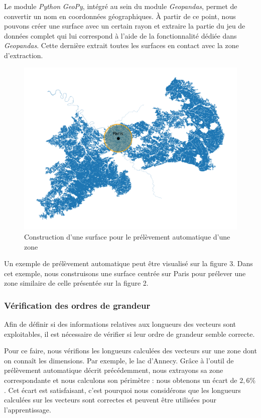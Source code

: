 Le module \emph{Python} \emph{GeoPy}, intégré au sein du module \emph{Geopandas}, permet de convertir un nom en coordonnées géographiques.
À partir de ce point, nous pouvons créer une surface avec un certain rayon et extraire la partie du jeu de données complet qui lui correspond à l'aide de la fonctionnalité dédiée dans \emph{Geopandas}.
Cette dernière extrait toutes les surfaces en contact avec la zone d'extraction.


\begin{figure}
    \centering
    \includegraphics[scale=0.5]{figures/zone-paris}
    \caption{Construction d'une surface pour le prélèvement automatique d'une zone}
\end{figure}



Un exemple de prélèvement automatique peut être visualisé sur la figure 3.
Dans cet exemple, nous construisons une surface centrée sur Paris pour prélever une zone similaire de celle présentée sur la figure 2.

\subsubsection{Vérification des ordres de grandeur}

Afin de définir si des informations relatives aux longueurs des vecteurs sont exploitables, il est nécessaire de vérifier si leur ordre de grandeur semble correcte.

Pour ce faire, nous vérifions les longueurs calculées des vecteurs sur une zone dont on connaît les dimensions.
Par exemple, le lac d'Annecy.
Grâce à l'outil de prélèvement automatique décrit précédemment, nous extrayons sa zone correspondante et nous calculons son périmètre : nous obtenons un écart de $2,6\%$.
Cet écart est satisfaisant, c'est pourquoi nous considérons que les longueurs calculées sur les vecteurs sont correctes et peuvent être utilisées pour l'apprentissage.


